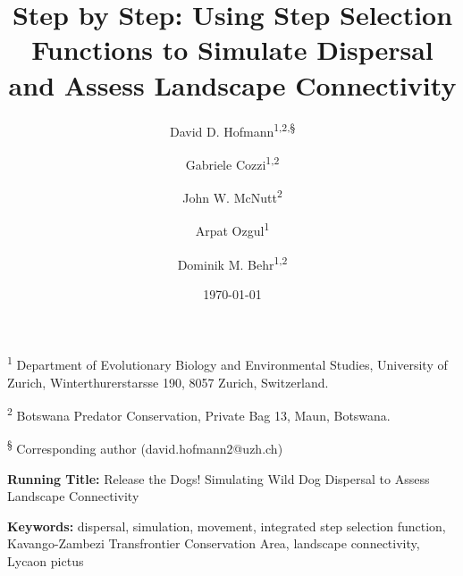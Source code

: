 \documentclass[abstract=on,10pt,a4paper,bibliography=totocnumbered]{article}
\title{Step by Step: Using Step Selection Functions to Simulate Dispersal and
Assess Landscape Connectivity}
\author{
  David D. Hofmann\textsuperscript{1,2,\S} \and
  Gabriele Cozzi\textsuperscript{1,2} \and
  John W. McNutt\textsuperscript{2} \and
  Arpat Ozgul\textsuperscript{1} \and
  Dominik M. Behr\textsuperscript{1,2}
}
\date{\today}
\begin{document}



\maketitle

\begin{flushleft}

\vspace{0.5cm}

\textsuperscript{1} Department of Evolutionary Biology and Environmental
Studies, University of Zurich, Winterthurerstarsse 190, 8057 Zurich,
Switzerland.

\textsuperscript{2} Botswana Predator Conservation, Private Bag 13, Maun,
Botswana.

\textsuperscript{\S} Corresponding author (david.hofmann2@uzh.ch)

\vspace{4cm}

\textbf{Running Title:} Release the Dogs! Simulating Wild Dog Dispersal to
Assess Landscape Connectivity

\vspace{0.5cm}

\textbf{Keywords:} dispersal, simulation, movement, integrated step selection
function, Kavango-Zambezi Transfrontier Conservation Area, landscape
connectivity, Lycaon pictus

\end{flushleft}
\end{document}
